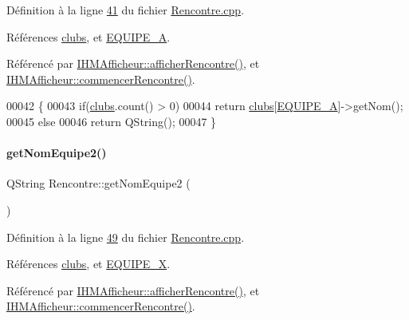 Définition à la ligne \hyperlink{_rencontre_8cpp_source_l00041}{41} du fichier \hyperlink{_rencontre_8cpp_source}{Rencontre.\+cpp}.



Références \hyperlink{_rencontre_8h_source_l00030}{clubs}, et \hyperlink{_rencontre_8h_source_l00017}{E\+Q\+U\+I\+P\+E\+\_\+A}.



Référencé par \hyperlink{_i_h_m_afficheur_8cpp_source_l00100}{I\+H\+M\+Afficheur\+::afficher\+Rencontre()}, et \hyperlink{_i_h_m_afficheur_8cpp_source_l00090}{I\+H\+M\+Afficheur\+::commencer\+Rencontre()}.


\begin{DoxyCode}
00042 \{
00043     \textcolor{keywordflow}{if}(\hyperlink{class_rencontre_a12f6cef62070ecb095971e704a9d92a6}{clubs}.count() > 0)
00044         \textcolor{keywordflow}{return} \hyperlink{class_rencontre_a12f6cef62070ecb095971e704a9d92a6}{clubs}[\hyperlink{_rencontre_8h_ab4f4f1173fbbb2f1f27e2b18c5de79dc}{EQUIPE\_A}]->getNom();
00045     \textcolor{keywordflow}{else}
00046         \textcolor{keywordflow}{return} QString();
00047 \}
\end{DoxyCode}
\mbox{\label{class_rencontre_ac544f97755480e0e2718d0802d308585}} 
\paragraph{\texorpdfstring{get\+Nom\+Equipe2()}{getNomEquipe2()}}
{\footnotesize\ttfamily Q\+String Rencontre\+::get\+Nom\+Equipe2 (\begin{DoxyParamCaption}{ }\end{DoxyParamCaption})}



Définition à la ligne \hyperlink{_rencontre_8cpp_source_l00049}{49} du fichier \hyperlink{_rencontre_8cpp_source}{Rencontre.\+cpp}.



Références \hyperlink{_rencontre_8h_source_l00030}{clubs}, et \hyperlink{_rencontre_8h_source_l00018}{E\+Q\+U\+I\+P\+E\+\_\+X}.



Référencé par \hyperlink{_i_h_m_afficheur_8cpp_source_l00100}{I\+H\+M\+Afficheur\+::afficher\+Rencontre()}, et \hyperlink{_i_h_m_afficheur_8cpp_source_l00090}{I\+H\+M\+Afficheur\+::commencer\+Rencontre()}.


